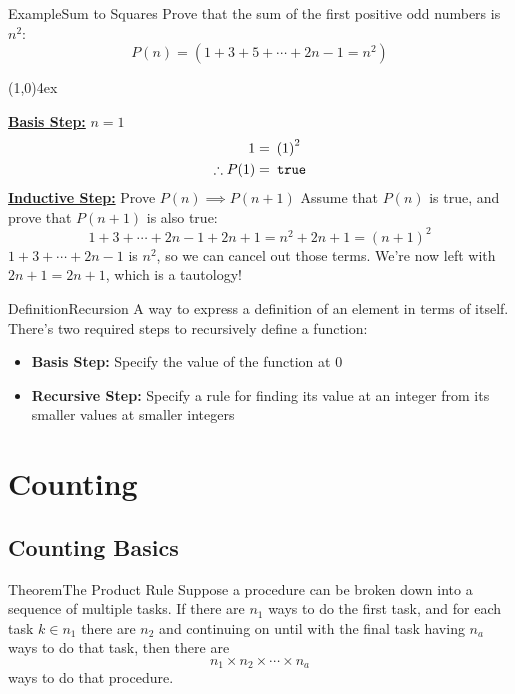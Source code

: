 \documentclass{MathNotes}
\newenvironment{example}[1]{\begin{BlueBox}{Example}{#1}}{\end{BlueBox}}
\newenvironment{definition}[1]{\begin{RedBox}{Definition}{#1}}{\end{RedBox}}
\newenvironment{theorem}[1]{\begin{GrayBox}{Theorem}{#1}}{\end{GrayBox}}
\newcommand{\br}{
	\begin{center}
		\line(1,0){4ex}
	\end{center}
}
\begin{document}
\begin{example}{Sum to Squares}
	Prove that the sum of the first positive odd numbers is $n^2$:
	\[\displaystyle P(n)=\left(1+3+5+\cdots+2n-1=n^2\right)\]
	\br{}
	\underline{\textbf{Basis Step:}} $n=1$\newline
	\begin{align*}
		1=               & \hspace{0.5em}{(1)}^2 \\
		\therefore P(1)= & \texttt{ true}
	\end{align*}
	\underline{\textbf{Inductive Step:}} Prove $P(n)\implies P(n+1)$\newline
	Assume that $P(n)$ is true, and prove that $P(n+1)$ is also true:
	\[1+3+\cdots+2n-1+2n+1=n^2+2n+1=\left(n+1\right)^2\]
	$1+3+\cdots+2n-1$ is $n^2$, so we can cancel out those terms. We're now
	left with $2n+1=2n+1$, which is a tautology!
\end{example}

\begin{definition}{Recursion}\label{def:recursion}
	A way to express a definition of an element in terms of itself. There's
	two required steps to recursively define a function:
	\begin{itemize}
		\item \textbf{Basis Step:} Specify the value of the function at 0
		\item \textbf{Recursive Step:} Specify a rule for finding its value at
		      an integer from its smaller values at smaller integers
	\end{itemize}
\end{definition}

\section{Counting}\label{sec:counting}
\subsection{Counting Basics}\label{sec:counting-basics}
\begin{theorem}{The Product Rule}\label{th:product-rule}
	Suppose a procedure can be broken down into a sequence of multiple tasks.
	If there are $n_1$ ways to do the first task, and for each task $k\in n_1$
	there are $n_2$ and continuing on until with the final task having $n_a$
	ways to do that task,  then there are \[n_1\times n_2\times\cdots\times n_a\]
	ways to do that procedure.
\end{theorem}
\end{document}
